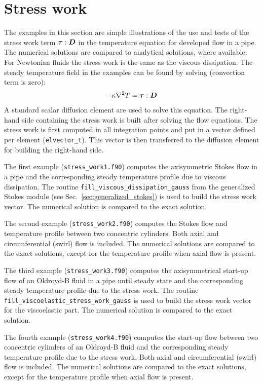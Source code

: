 
\def\headdate{11th May 2019}

\section{Stress work}
\label{sec:stresswork}

The examples in this section are simple illustrations of the use and tests of the stress work term 
$\boldsymbol{\tau}:\boldsymbol{D}$ in
the temperature equation for developed flow in a pipe. The numerical solutions are compared to analytical solutions, where available.
For Newtonian fluids the stress work is the same as the viscous dissipation.
The steady temperature field in the examples can be found by solving (convection term is zero): 
\begin{equation}
  -\kappa\nabla^2 T = \boldsymbol{\tau} : \boldsymbol{D} 
  \label{eq:steadytemp}
\end{equation}
A standard scalar diffusion element are used to solve this equation. The right-hand side containing the stress work is built after solving the flow equations. The stress work is first computed in all integration points and put in a vector defined per element (\texttt{elvector\_t}). This vector is then transferred to the diffusion element for building the right-hand side.

The first example (\texttt{stress\_work1.f90}) computes the axisymmetric Stokes flow in a pipe and the corresponding steady temperature profile due to viscous dissipation. The routine \texttt{fill\_viscous\_dissipation\_gauss} from the generalized Stokes module (see Sec.~\ref{sec:generalized_stokes}) is used to build the stress work vector. The numerical solution is compared to the exact solution.

The second example (\texttt{stress\_work2.f90}) computes the Stokes flow and temperature profile between two concentric cylinders. Both axial and circumferential (swirl) flow is included. The numerical solutions are compared to the exact solutions, except for the temperature profile when axial flow is present.

The third example (\texttt{stress\_work3.f90}) computes the axisymmetrical start-up flow of an Oldroyd-B fluid in a pipe until steady state and the corresponding steady temperature profile due to the stress work. The routine \texttt{fill\_viscoelastic\_stress\_work\_gauss} is used to build the stress work vector for the viscoelastic part. The numerical solution is compared to the exact solution.

The fourth example (\texttt{stress\_work4.f90}) computes the start-up flow between two concentric cylinders of an Oldroyd-B fluid
and the corresponding steady temperature profile due to the stress work. Both axial and circumferential (swirl) flow is included. The numerical solutions are compared to the exact solutions, except for the temperature profile when axial flow is present.
